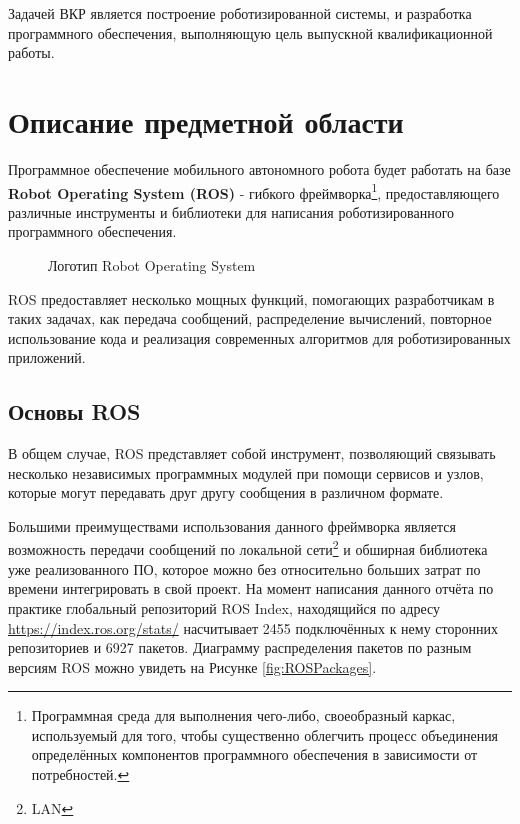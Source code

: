 \documentclass[12pt,a4paper]{scrartcl}
\begin{document}
			Задачей ВКР является построение роботизированной системы, и разработка программного обеспечения, выполняющую цель выпускной квалификационной работы.
			
		\section{Описание предметной области} \label{sec:Description}
			Программное обеспечение мобильного автономного робота будет работать на базе \textbf{Robot Operating System (ROS)} - гибкого фреймворка\footnote{Программная среда для выполнения чего-либо, своеобразный каркас, используемый для того, чтобы существенно облегчить процесс объединения определённых компонентов программного обеспечения в зависимости от потребностей\cite{bib:FrameworkDefinition}.}, предоставляющего различные инструменты и библиотеки для написания роботизированного программного обеспечения. 
			
			\begin{figure}[h]
				\caption{Логотип Robot Operating System}
				\label{fig:ROSLogo}
			\end{figure}
			
			ROS предоставляет несколько мощных функций, помогающих разработчикам в таких задачах, как передача сообщений, распределение вычислений, повторное использование кода и реализация современных алгоритмов для роботизированных приложений\cite{bib:ROSDefinition}.
			
			\subsection{Основы ROS}
				В общем случае, ROS представляет собой инструмент, позволяющий связывать несколько независимых программных модулей при помощи сервисов и узлов, которые могут передавать друг другу сообщения в различном формате.
				
				Большими преимуществами использования данного фреймворка является возможность передачи сообщений по локальной сети\footnote{LAN} и обширная библиотека уже реализованного ПО, которое можно без относительно больших затрат по времени интегрировать в свой проект. На момент написания данного отчёта по практике глобальный репозиторий ROS Index, находящийся по адресу \href{https://index.ros.org/stats/}{https://index.ros.org/stats/} насчитывает 2455 подключённых к нему сторонних репозиториев и 6927 пакетов. Диаграмму распределения пакетов по разным версиям ROS можно увидеть на Рисунке \ref{fig:ROSPackages}\cite{bib:RosStats}.
				
\end{document}
